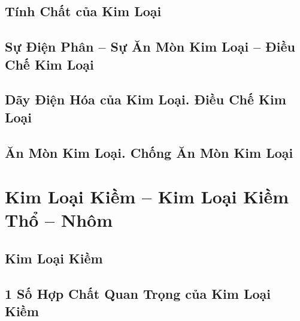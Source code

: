\documentclass{article}
\numberwithin{equation}{section}
\begin{document}

\subsection{Tính Chất của Kim Loại}


\subsection{Sự Điện Phân -- Sự Ăn Mòn Kim Loại -- Điều Chế Kim Loại}


\subsection{Dãy Điện Hóa của Kim Loại. Điều Chế Kim Loại}


\subsection{Ăn Mòn Kim Loại. Chống Ăn Mòn Kim Loại}


\section{Kim Loại Kiềm -- Kim Loại Kiềm Thổ -- Nhôm}

\subsection{Kim Loại Kiềm}


\subsection{1 Số Hợp Chất Quan Trọng của Kim Loại Kiềm}

\end{document}
